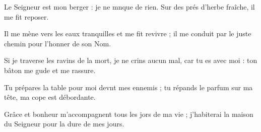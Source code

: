 \item Le Seigneur est mon berger : je ne mnque de rien.\psstar{} Sur des prés d’herbe fraîche, il me fit reposer.
\item Il me mène vers les eaux tranquilles et me fit revivre ;\psstar{} il me conduit par le juste chemin pour l’honner de son Nom.
\item Si je traverse les ravins de la mort, je ne crins aucun mal,\psstar{} car tu es avec moi : ton bâton me gude et me rassure.
\item Tu prépares la table pour moi devnt mes ennemis ;\psstar{} tu répands le parfum sur ma tête, ma cope est débordante.
\item Grâce et bonheur m’accompagnent tous les jors de ma vie ;\psstar{} j’habiterai la maison du Seigneur pour la dure de mes jours.